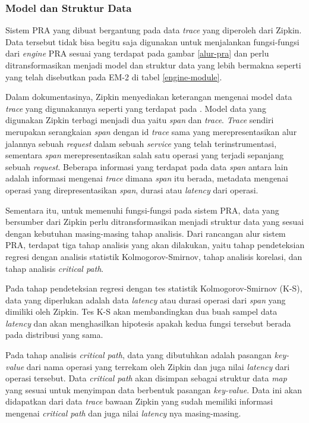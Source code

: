 \pagebreak


\subsubsection{Model dan Struktur Data}
Sistem PRA yang dibuat bergantung pada data \textit{trace} yang diperoleh dari Zipkin. Data tersebut tidak bisa begitu saja digunakan untuk menjalankan fungsi-fungsi dari \textit{engine} PRA sesuai yang terdapat pada gambar \ref{alur-pra} dan perlu ditransformasikan menjadi model dan struktur data yang lebih bermakna seperti yang telah disebutkan pada EM-2 di tabel \ref{engine-module}.

Dalam dokumentasinya, Zipkin menyediakan keterangan mengenai model data \textit{trace} yang digunakannya seperti yang terdapat pada \citep{zipkin-data}. Model data yang digunakan Zipkin terbagi menjadi dua yaitu \textit{span} dan \textit{trace}. \textit{Trace} sendiri merupakan serangkaian \textit{span} dengan id \textit{trace} sama yang merepresentasikan alur jalannya sebuah \textit{request} dalam sebuah \textit{service} yang telah terinstrumentasi, sementara \textit{span} merepresentasikan salah satu operasi yang terjadi sepanjang sebuah \textit{request}. Beberapa informasi yang terdapat pada data \textit{span} antara lain adalah informasi mengenai \textit{trace} dimana \textit{span} itu berada, metadata mengenai operasi yang direpresentasikan \textit{span}, durasi atau \textit{latency} dari operasi.

Sementara itu, untuk memenuhi fungsi-fungsi pada sistem PRA, data yang bersumber dari Zipkin perlu ditransformasikan menjadi struktur data yang sesuai dengan kebutuhan masing-masing tahap analisis. Dari rancangan alur sistem PRA, terdapat tiga tahap analisis yang akan dilakukan, yaitu tahap pendeteksian regresi dengan analisis statistik Kolmogorov-Smirnov, tahap analisis korelasi, dan tahap analisis \textit{critical path}.

Pada tahap pendeteksian regresi dengan tes statistik Kolmogorov-Smirnov (K-S), data yang diperlukan adalah data \textit{latency} atau durasi operasi dari \textit{span} yang dimiliki oleh Zipkin. Tes K-S akan membandingkan dua buah sampel data \textit{latency} dan akan menghasilkan hipotesis apakah kedua fungsi tersebut berada pada distribusi yang sama.

Pada tahap analisis \textit{critical path}, data yang dibutuhkan adalah pasangan \textit{key-value} dari nama operasi yang terrekam oleh Zipkin dan juga nilai \textit{latency} dari operasi tersebut. Data \textit{critical path} akan disimpan sebagai struktur data \textit{map} yang sesuai untuk menyimpan data berbentuk pasangan \textit{key-value}. Data ini akan didapatkan dari data \textit{trace} bawaan Zipkin yang sudah memiliki informasi mengenai \textit{critical path} dan juga nilai \textit{latency} nya masing-masing. 

